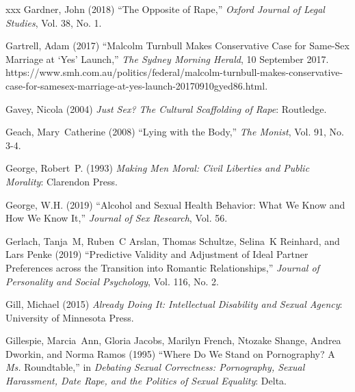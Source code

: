 \documentclass[]{jlreq} \usepackage{mystyle}
\begin{document}
\begin{thebibliography}{xxx}
Gardner, John (2018) ``The Opposite of Rape,'' \textit{ Oxford Journal of Legal
  Studies}, Vol. 38, No. 1.

Gartrell, Adam (2017) ``Malcolm Turnbull Makes Conservative Case for Same-Sex
  Marriage at `Yes' Launch,'' \emph{The Sydney Morning Herald}, 10 September
  2017.
  https://www.smh.com.au/politics/federal/malcolm-turnbull-makes-conservative-case-for-samesex-marriage-at-yes-launch-20170910gyed86.html.

Gavey, Nicola (2004)  \textit{ Just Sex? The Cultural Scaffolding of Rape}:
  Routledge.

Geach, Mary~Catherine (2008) ``Lying with the Body,'' \textit{ The Monist},
  Vol. 91, No. 3-4.

George, Robert~P. (1993)  \textit{ Making Men Moral: Civil Liberties and Public
  Morality}: Clarendon Press.

George, W.H. (2019) ``Alcohol and Sexual Health Behavior: What We Know and How
  We Know It,'' \textit{ Journal of Sex Research}, Vol. 56.

Gerlach, Tanja~M, Ruben~C Arslan, Thomas Schultze, Selina~K Reinhard, and Lars
  Penke (2019) ``Predictive Validity and Adjustment of Ideal Partner
  Preferences across the Transition into Romantic Relationships,'' \textit{
  Journal of Personality and Social Psychology}, Vol. 116, No. 2.

Gill, Michael (2015)  \textit{ Already Doing It: Intellectual Disability and
  Sexual Agency}: University of Minnesota Press.

Gillespie, Marcia~Ann, Gloria Jacobs, Marilyn French, Ntozake Shange, Andrea
  Dworkin, and Norma Ramos (1995) ``Where Do We Stand on Pornography? A
  \emph{Ms.} Roundtable,'' in  \textit{ Debating Sexual Correctness:
  Pornography, Sexual Harassment, Date Rape, and the Politics of Sexual
  Equality}: Delta.


\end{thebibliography}
\end{document}
